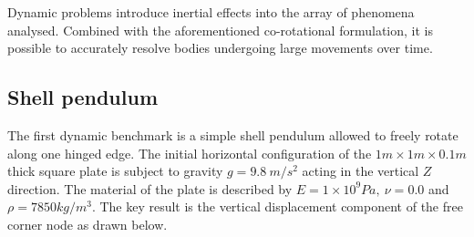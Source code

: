 Dynamic problems introduce inertial effects into the array of phenomena analysed. Combined with the aforementioned co-rotational formulation, it is possible to accurately resolve bodies undergoing large movements over time.

\subsection{Shell pendulum}
\label{validation:shell pendulum}
The first dynamic benchmark is a simple shell pendulum allowed to freely rotate along one hinged edge. The initial horizontal configuration of the $1m\times1m\times0.1m$ thick square plate is subject to gravity $g = 9.8\ m/s^2$ acting in the vertical $Z$ direction. The material of the plate is described by $E = 1\times 10^9 Pa,\ \nu = 0.0$ and $\rho = 7850 kg/m^3$. The key result is the vertical displacement component of the free corner node as drawn below.

